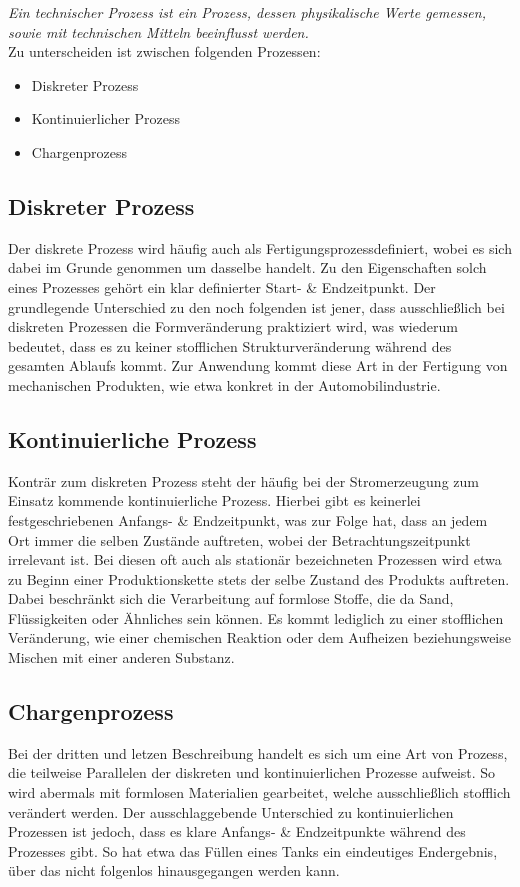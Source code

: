 	\textit{Ein technischer Prozess ist ein Prozess, dessen physikalische Werte gemessen, sowie mit technischen Mitteln beeinflusst werden.}\\
	
	Zu unterscheiden ist zwischen folgenden Prozessen:
	
	\begin{itemize}
		\item Diskreter Prozess
		\item Kontinuierlicher Prozess
		\item Chargenprozess
	\end{itemize}
	
	\subsection{Diskreter Prozess}
	Der diskrete Prozess wird häufig auch als \glqq Fertigungsprozess\grqq\space definiert, wobei es sich dabei im Grunde genommen um dasselbe handelt. Zu den Eigenschaften solch eines Prozesses gehört ein klar definierter Start- \& Endzeitpunkt. Der grundlegende Unterschied zu den noch folgenden ist jener, dass ausschließlich bei diskreten Prozessen die Formveränderung praktiziert wird, was wiederum bedeutet, dass es zu keiner stofflichen Strukturveränderung während des gesamten Ablaufs kommt. Zur Anwendung kommt diese Art in der Fertigung von mechanischen Produkten, wie etwa konkret in der Automobilindustrie.
	
	\subsection{Kontinuierliche Prozess}
	Konträr zum diskreten Prozess steht der häufig bei der Stromerzeugung zum Einsatz kommende kontinuierliche Prozess. Hierbei gibt es keinerlei festgeschriebenen Anfangs- \& Endzeitpunkt, was zur Folge hat, dass an jedem Ort immer die selben Zustände auftreten, wobei der Betrachtungszeitpunkt irrelevant ist. Bei diesen oft auch als stationär bezeichneten Prozessen wird etwa zu Beginn einer Produktionskette stets der selbe Zustand des Produkts auftreten. Dabei beschränkt sich die Verarbeitung auf formlose Stoffe, die da Sand, Flüssigkeiten oder Ähnliches sein können. Es kommt lediglich zu einer stofflichen Veränderung, wie einer chemischen Reaktion oder dem Aufheizen beziehungsweise Mischen mit einer anderen Substanz.
	
	\subsection{Chargenprozess}
	Bei der dritten und letzen Beschreibung handelt es sich um eine Art von Prozess, die teilweise Parallelen der diskreten und kontinuierlichen Prozesse aufweist. So wird abermals mit formlosen Materialien gearbeitet, welche ausschließlich stofflich verändert werden. Der ausschlaggebende Unterschied zu kontinuierlichen Prozessen ist jedoch, dass es klare Anfangs- \& Endzeitpunkte während des Prozesses gibt. So hat etwa das Füllen eines Tanks ein eindeutiges Endergebnis, über das nicht folgenlos hinausgegangen werden kann.\\

